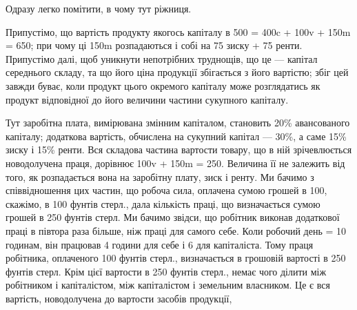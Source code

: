 Одразу легко помітити, в чому тут ріжниця.

Припустімо, що вартість продукту якогось капіталу в 500 = 400c +
100v + 150m = 650; при чому ці 150m розпадаються і собі на 75 зиску +
75 ренти. Припустімо далі, щоб уникнути непотрібних труднощів, що це —
капітал середнього складу, та що його ціна продукції збігається з його вартістю;
збіг цей завжди буває, коли продукт цього окремого капіталу може розглядатись
як продукт відповідної до його величини частини сукупного капіталу.

Тут заробітна плата, вимірювана змінним капіталом, становить 20\% авансованого
капіталу; додаткова вартість, обчислена на сукупний капітал — 30\%,
а саме 15\% зиску і 15\% ренти. Вся складова частина вартости товару, що
в ній зрічевлюється новодолучена праця, дорівнює 100v + 150m = 250. Величина
її не залежить від того, як розпадається вона на заробітну плату, зиск і ренту.
Ми бачимо з співвідношення цих частин, що робоча сила, оплачена сумою
грошей в 100, скажімо, в 100 фунтів стерл., дала кількість праці, що визначається
сумою грошей в 250 фунтів стерл. Ми бачимо звідси, що робітник
виконав додаткової праці в півтора раза більше, ніж праці для самого себе.
Коли робочий день = 10 годинам, він працював 4 години для себе і 6 для
капіталіста. Тому праця робітника, оплаченого 100 фунтів стерл., визначається
в грошовій вартості в 250 фунтів стерл. Крім цієї вартости в 250 фунтів стерл.,
немає чого ділити між робітником і капіталістом, між капіталістом і земельним
власником. Це є вся вартість, новодолучена до вартости засобів продукції,